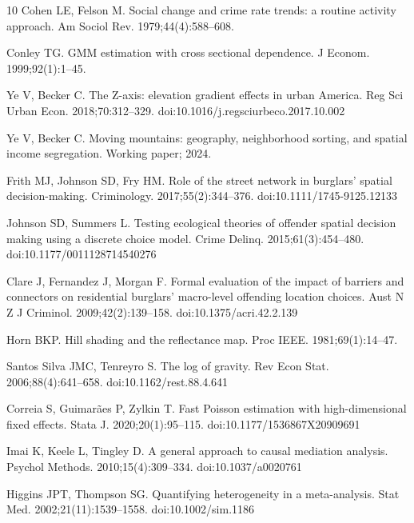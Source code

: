\documentclass[11pt,letterpaper]{article}
\begin{document}
\begin{thebibliography}{10}
Cohen LE, Felson M.
\newblock Social change and crime rate trends: a routine activity approach.
\newblock Am Sociol Rev. 1979;44(4):588--608.

Conley TG.
\newblock GMM estimation with cross sectional dependence.
\newblock J Econom. 1999;92(1):1--45.

Ye V, Becker C.
\newblock The Z-axis: elevation gradient effects in urban America.
\newblock Reg Sci Urban Econ. 2018;70:312--329.
\newblock doi:10.1016/j.regsciurbeco.2017.10.002

Ye V, Becker C.
\newblock Moving mountains: geography, neighborhood sorting, and spatial income
segregation.
\newblock Working paper; 2024.

Frith MJ, Johnson SD, Fry HM.
\newblock Role of the street network in burglars' spatial decision-making.
\newblock Criminology. 2017;55(2):344--376.
\newblock doi:10.1111/1745-9125.12133

Johnson SD, Summers L.
\newblock Testing ecological theories of offender spatial decision making using a
discrete choice model.
\newblock Crime Delinq. 2015;61(3):454--480.
\newblock doi:10.1177/0011128714540276

Clare J, Fernandez J, Morgan F.
\newblock Formal evaluation of the impact of barriers and connectors on residential
burglars' macro-level offending location choices.
\newblock Aust N Z J Criminol. 2009;42(2):139--158.
\newblock doi:10.1375/acri.42.2.139

Horn BKP.
\newblock Hill shading and the reflectance map.
\newblock Proc IEEE. 1981;69(1):14--47.

Santos Silva JMC, Tenreyro S.
\newblock The log of gravity.
\newblock Rev Econ Stat. 2006;88(4):641--658.
\newblock doi:10.1162/rest.88.4.641

Correia S, Guimar\~aes P, Zylkin T.
\newblock Fast Poisson estimation with high-dimensional fixed effects.
\newblock Stata J. 2020;20(1):95--115.
\newblock doi:10.1177/1536867X20909691

Imai K, Keele L, Tingley D.
\newblock A general approach to causal mediation analysis.
\newblock Psychol Methods. 2010;15(4):309--334.
\newblock doi:10.1037/a0020761

Higgins JPT, Thompson SG.
\newblock Quantifying heterogeneity in a meta-analysis.
\newblock Stat Med. 2002;21(11):1539--1558.
\newblock doi:10.1002/sim.1186


\end{thebibliography}
\end{document}
